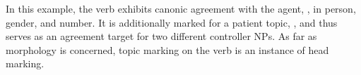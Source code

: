 In this example, the verb exhibits canonic agreement with the agent, 
, in person, gender, and number. It is additionally marked 
for a patient topic, , and thus serves as an agreement target
for two different controller NPs. As far as morphology is concerned, topic
marking on the verb is an instance of head marking.

